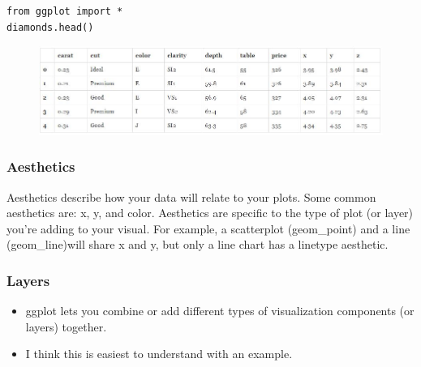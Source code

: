 \documentclass{beamer}
\begin{document}
\begin{frame}[fragile]
\begin{framed}
	\begin{verbatim}
from ggplot import *
diamonds.head()
\end{verbatim}
\end{framed}
\begin{figure}
\centering
\includegraphics[width=1.1\linewidth]{diamondsdata}

\end{figure}

\end{frame}	
\begin{frame}[fragile]
\frametitle{Aesthetics}
Aesthetics describe how your data will relate to your plots. Some common aesthetics are: x, y, and color. Aesthetics are specific to the type of plot (or layer) you're adding to your visual. For example, a scatterplot (geom\_point) and a line (geom\_line)will share x and y, but only a line chart has a linetype aesthetic.

\end{frame}
\begin{frame}[fragile]
\frametitle{Layers}
\begin{itemize}
\item ggplot lets you combine or add different types of visualization components (or layers) together. 
\item I think this is easiest to understand with an example.
\end{itemize}

\end{frame}
\end{document}
